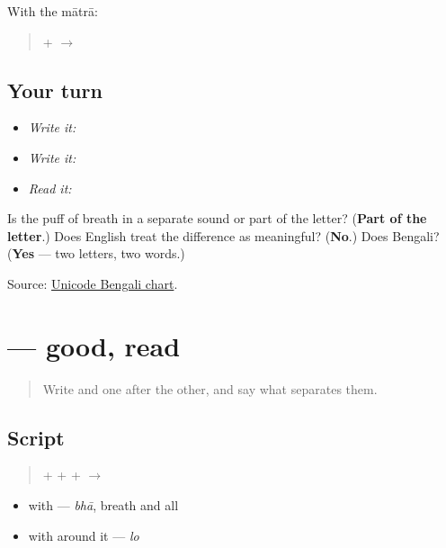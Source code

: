 With the mātrā:

\begin{quote}
\textbf{} + \textbf{} $\to$ \textbf{}
\end{quote}

\subsection*{Your turn}
\begin{itemize}
\raggedright
  \item \emph{Write it:} 
  \item \emph{Write it:}  
  \item \emph{Read it:} 
\end{itemize}

\begin{tcolorbox}[breakable,colback=teal!4,colframe=teal!35!black,title={Before you move on}]
Is the puff of breath in \textbf{} a separate sound or part of the letter? (\textbf{Part of the letter}.) Does English treat the difference as meaningful? (\textbf{No}.) Does Bengali? (\textbf{Yes} — two letters, two words.)

Source: \href{https://www.unicode.org/charts/PDF/U0980.pdf}{Unicode Bengali chart}.
\end{tcolorbox}
\section[bhālo]{ — good, read}

\label{lesson:BN-W03-bhalo-read}



\begin{quote}
Write \textbf{} and \textbf{} one after the other, and say what separates them.
\end{quote}

\subsection*{Script}
\begin{quote}
\textbf{} + \textbf{} + \textbf{} + \textbf{} $\to$ \textbf{}
\end{quote}

\begin{itemize}
\raggedright
  \item \textbf{} with \textbf{} — \emph{bhā}, breath and all
  \item \textbf{} with \textbf{} around it — \emph{lo}
\end{itemize}

